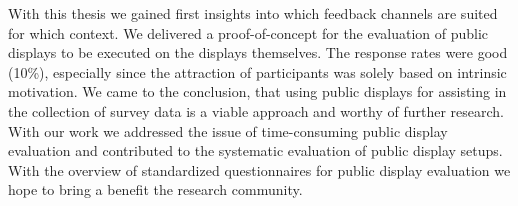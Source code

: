 	With this thesis we gained first insights into which feedback channels are suited for which context. We delivered a proof-of-concept for the evaluation of public displays to be executed on the displays themselves.
	The response rates were good (10\%), especially since the attraction of participants was solely based on intrinsic motivation. We came to the conclusion, that using public displays for assisting in the collection of survey data is a viable approach and worthy of further research.
	With our work we addressed the issue of time-consuming public display evaluation and contributed to the systematic evaluation of public display setups. With the overview of standardized questionnaires for public display evaluation we hope to bring a benefit the research community.







